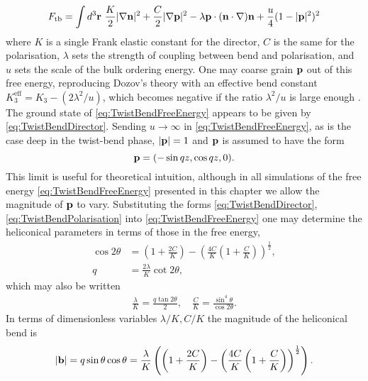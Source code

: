 \begin{equation}
    F_{\mathrm{tb}} =  \int d^3 {\bf r}\ \frac{K}{2}|\nabla {\bf n}|^2 +\frac{C}{2}|\nabla {\bf p}|^2 -\lambda \w p \cdot (\w n \cdot \nabla)\w n + \frac{u}{4}(1 - |\w p|^2)^2
    \label{eq:TwistBendFreeEnergy}
\end{equation}
where $K$ is a single Frank elastic constant for the director, $C$ is the same for the polarisation, $\lambda$ sets the strength of coupling between bend and polarisation, and $u$ sets the scale of the bulk ordering energy. One may coarse grain $\mathbf{p}$ out of this free energy, reproducing Dozov's theory with an effective bend constant $K_3^{\mathrm{eff}} = K_3 - (2\lambda^2/u)$, which becomes negative if the ratio $\lambda^2/u$ is large enough \citep{Meyer2016}. The ground state of \eqref{eq:TwistBendFreeEnergy} appears to be given by \eqref{eq:TwistBendDirector}. Sending $u \rightarrow \infty$ in \eqref{eq:TwistBendFreeEnergy}, as is the case deep in the twist-bend phase, $|\mathbf{p}|=1$ and $\mathbf{p}$ is assumed to have the form  
\begin{equation}
\mathbf{p} = (- \sin q z, \cos q z ,0).
\label{eq:TwistBendPolarisation}
\end{equation}
This limit is useful for theoretical intuition, although in all simulations of the free energy \eqref{eq:TwistBendFreeEnergy} presented in this chapter we allow the magnitude of $\mathbf{p}$ to vary. Substituting the forms \eqref{eq:TwistBendDirector}, \eqref{eq:TwistBendPolarisation} into \eqref{eq:TwistBendFreeEnergy} one may determine the heliconical parameters in terms of those in the free energy,
\begin{align}
    \label{eq:theta}
    \cos 2 \theta &= \left( 1+ \frac{2C}{K} \right) - \left( \frac{4C}{K}  \left( 1+ \frac{C}{K} \right) \right)^\frac{1}{2},\\
    \label{eq:q}
    q &= \frac{2 \lambda}{K} \cot 2 \theta,
\end{align}
which may also be written
\begin{align}
    \frac{\lambda}{K} = \frac{q \tan 2 \theta}{2}, \quad 
    \frac{C}{K} = \frac{\sin^4\theta}{\cos 2 \theta}.
\end{align}
In terms of dimensionless variables $\lambda/K , C/K$ the magnitude of the heliconical bend is
\begin{align}
    |\mathbf{b}| = q\sin\theta\cos\theta = \frac{\lambda}{K}\left( \left( 1+ \frac{2C}{K} \right) - \left( \frac{4C}{K}  \left( 1+ \frac{C}{K} \right) \right)^\frac{1}{2}\right).
    \label{eq:magb}
\end{align}
